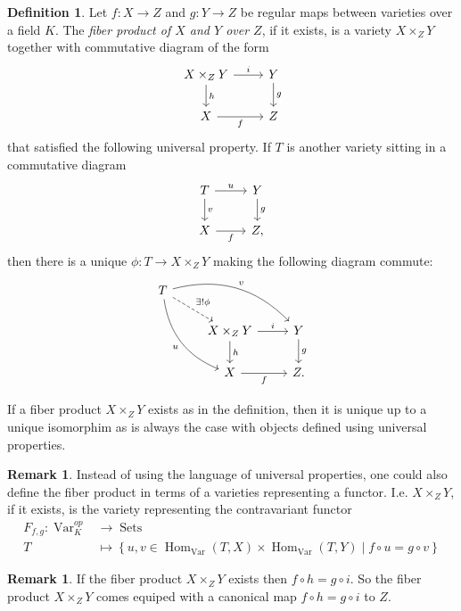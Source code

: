 \documentclass[a4paper,12pt,reqno]{amsart}
\newcommand{\set}[1]{\left\lbrace #1 \right\rbrace}
\DeclareMathOperator{\Var}{Var}
\DeclareMathOperator{\Sets}{Sets}
\DeclareMathOperator{\Hom}{Hom}
\theoremstyle{definition}
\newtheorem{definition}[lemma]{Definition}
\newtheorem{remark}[lemma]{Remark}
\numberwithin{lemma}{section}
\numberwithin{equation}{section}
\numberwithin{figure}{section}
\begin{document}
\begin{definition}
Let $f: X \to Z$ and $g : Y \to Z$ be regular maps between varieties over a field $K$. The \textit{fiber product of $X$ and $Y$ over $Z$}, if it exists, is a variety $X \times_Z Y$ together with commutative diagram of the form 
\[
\begin{tikzcd}
	X \times_Z Y \arrow[r,"i"] \arrow[d,"h"] & Y \arrow[d, "g"] \\
	X \arrow[r, "f"'] & Z
\end{tikzcd}
\]
 that satisfied the following universal property. If $T$ is another variety sitting in a commutative diagram
\[
\begin{tikzcd}
	T \arrow[r,"u"] \arrow[d,"v"] & Y \arrow[d, "g"] \\
	X \arrow[r, "f"'] & Z,
\end{tikzcd}
\]
then there is a unique $\phi : T \to X\times_Z Y$ making the following diagram commute:
\[
\begin{tikzcd}
T \arrow[ddr, bend right, "u"'] \arrow[drr, bend left, "v"] \arrow[dr, dashed, "\exists !\phi"] & & \\
& X \times_Z Y \arrow[r,"i"] \arrow[d,"h"] & Y \arrow[d, "g"] \\
& X \arrow[r, "f"'] & Z.
\end{tikzcd}
\]
\end{definition}\label{def:fiber_product_abstract}
If a fiber product $X\times_Z Y$ exists as in the definition, then it is unique up to a unique isomorphim as is always the case with objects defined using universal properties.

\begin{remark}Instead of using the language of universal properties, one could also define the fiber product in terms of a varieties representing a functor. I.e.  $X \times_Z Y$, if it exists, is the variety representing the contravariant functor
	\begin{align*}
	    F_{f,g} : \Var_K^{op} &\to \Sets \\
	         T &\mapsto \set{u,v \in \Hom_{\Var}(T,X) \times \Hom_{\Var}(T,Y)  \mid f\circ u = g \circ v}
	\end{align*}
\end{remark}

\begin{remark}\label{rem:fiber-product-map-to-base}
If the fiber product $X \times_Z Y$ exists then $f \circ h = g \circ i$. So the fiber product  $X \times_Z Y$ comes equiped with a canonical map $f \circ h = g \circ i$  to $Z$.
\end{remark}
\end{document}
